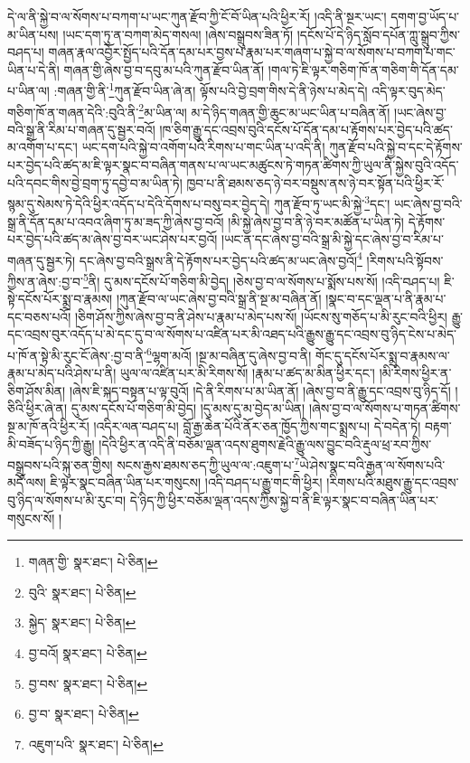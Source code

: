 དེ་ལ་ནི་སྐྱེ་བ་ལ་སོགས་པ་བཀག་པ་ཡང་ཀུན་རྫོབ་ཀྱི་ངོ་བོ་ཡིན་པའི་ཕྱིར་རོ། །འདི་ནི་སྔར་ཡང་། དགག་བྱ་ཡོད་པ་མ་ཡིན་པས། །ཡང་དག་ཏུ་ན་བཀག་མེད་གསལ། །ཞེས་བསྒྲུབས་ཟིན་ཏོ། །དངོས་པོ་དེ་ཉིད་སློབ་དཔོན་ཀླུ་སྒྲུབ་ཀྱིས་བཤད་པ། གཞན་རྣལ་འབྱོར་སྤྱོད་པའི་དོན་དམ་པར་བྱས་པ་རྣམ་པར་གཞག་པ་སྐྱེ་བ་ལ་སོགས་པ་བཀག་པ་གང་ཡིན་པ་དེ་ནི། གཞན་གྱི་ཞེས་བྱ་བ་དབུ་མ་པའི་ཀུན་རྫོབ་ཡིན་ནོ། །གལ་ཏེ་ཇི་ལྟར་གཅིག་ཁོ་ན་གཅིག་གི་དོན་དམ་པ་ཡིན་ལ། :གཞན་གྱི་ནི་\footnote{གཞན་གྱི་  སྣར་ཐང་།  པེ་ཅིན། }ཀུན་རྫོབ་ཡིན་ཞེ་ན། ལྟོས་པའི་བྱེ་བྲག་གིས་དེ་ནི་ཉེས་པ་མེད་དེ། འདི་ལྟར་བུད་མེད་གཅིག་ཁོ་ན་གཞན་དེའི་:བུའི་ནི་\footnote{བུའི་  སྣར་ཐང་།  པེ་ཅིན། }མ་ཡིན་ལ། མ་དེ་ཉིད་གཞན་གྱི་ཆུང་མ་ཡང་ཡིན་པ་བཞིན་ནོ། །ཡང་ཞེས་བྱ་བའི་སྒྲ་ནི་རིམ་པ་གཞན་དུ་སྦྱར་བའོ། །ཁ་ཅིག་རྒྱུ་དང་འབྲས་བུའི་དངོས་པོ་དོན་དམ་པ་རྟོགས་པར་བྱེད་པའི་ཚད་མ་འགོག་པ་དང་། ཡང་དག་པའི་སྐྱེ་བ་འགོག་པའི་རིགས་པ་གང་ཡིན་པ་འདི་ནི། ཀུན་རྫོབ་པའི་སྐྱེ་བ་དང་དེ་རྟོགས་པར་བྱེད་པའི་ཚད་མ་ཇི་ལྟར་སྣང་བ་བཞིན་གནས་པ་ལ་ཡང་མཚུངས་ཏེ་གཏན་ཚིགས་ཀྱི་ཡུལ་ནི་སྐྱེས་བུའི་འདོད་པའི་དབང་གིས་བྱེ་བྲག་ཏུ་དབྱེ་བ་མ་ཡིན་ཏེ། ཁྱབ་པ་ནི་ཐམས་ཅད་ཉེ་བར་བསྡུས་ནས་ཉེ་བར་སྟོན་པའི་ཕྱིར་རོ་སྙམ་དུ་སེམས་ཏེ་དེའི་ཕྱིར་འདོད་པ་དེའི་དོགས་པ་བསུ་བར་བྱེད་དེ། ཀུན་རྫོབ་ཏུ་ཡང་མི་སྐྱེ་\footnote{སྐྱེད་  སྣར་ཐང་།  པེ་ཅིན། }དང་། ཡང་ཞེས་བྱ་བའི་སྒྲ་ནི་དོན་དམ་པ་འབའ་ཞིག་ཏུ་མ་ཟད་ཀྱི་ཞེས་བྱ་བའོ། །མི་སྐྱེ་ཞེས་བྱ་བ་ནི་ཉེ་བར་མཚོན་པ་ཡིན་ཏེ། དེ་རྟོགས་པར་བྱེད་པའི་ཚད་མ་ཞེས་བྱ་བར་ཡང་ཤེས་པར་བྱའོ། །ཡང་ན་དང་ཞེས་བྱ་བའི་སྒྲ་མི་སྐྱེ་དང་ཞེས་བྱ་བ་རིམ་པ་གཞན་དུ་སྦྱར་ཏེ། དང་ཞེས་བྱ་བའི་སྒྲས་ནི་དེ་རྟོགས་པར་བྱེད་པའི་ཚད་མ་ཡང་ཞེས་བྱའོ།\footnote{བྱ་བའོ།  སྣར་ཐང་།  པེ་ཅིན། } །རིགས་པའི་སྟོབས་ཀྱིས་ན་ཞེས་:བྱ་བ་\footnote{བྱ་བས་  སྣར་ཐང་།  པེ་ཅིན། }ནི། དུ་མས་དངོས་པོ་གཅིག་མི་བྱེད། །ཅེས་བྱ་བ་ལ་སོགས་པ་སྨོས་པས་སོ། །འདི་བཤད་པ། ཇི་སྟེ་དངོས་པོར་སྨྲ་བ་རྣམས། །ཀུན་རྫོབ་ལ་ཡང་ཞེས་བྱ་བའི་སྒྲ་ནི་སྔ་མ་བཞིན་ནོ། །སྣང་བ་དང་ལྡན་པ་ནི་རྣམ་པ་དང་བཅས་པའོ། །ཅིག་ཤོས་ཀྱིས་ཞེས་བྱ་བ་ནི་ཤེས་པ་རྣམ་པ་མེད་པས་སོ། །ཡོངས་སུ་གཅོད་པ་མི་རུང་བའི་ཕྱིར། རྒྱུ་དང་འབྲས་བུར་འདོད་པ་མེ་དང་དུ་བ་ལ་སོགས་པ་འཛིན་པར་མི་འཐད་པའི་རྒྱུས་རྒྱུ་དང་འབྲས་བུ་ཉིད་ངེས་པ་མེད་པ་ཁོ་ན་སྟེ་མི་རུང་ངོ་ཞེས་:བྱ་བ་ནི་\footnote{བྱ་བ་  སྣར་ཐང་།  པེ་ཅིན། }ལྷག་མའོ། །སྔ་མ་བཞིན་དུ་ཞེས་བྱ་བ་ནི། གོང་དུ་དངོས་པོར་སྨྲ་བ་རྣམས་ལ་རྣམ་པ་མེད་པའི་ཤེས་པ་ནི། ཡུལ་ལ་འཛིན་པར་མི་རིགས་སོ། །རྣམ་པ་ཚད་མ་མིན་ཕྱིར་དང་། །མི་རིགས་ཕྱིར་ན་ཅིག་ཤོས་མིན། །ཞེས་ཇི་སྐད་བསྟན་པ་ལྟ་བུའོ། །དེ་ནི་རིགས་པ་མ་ཡིན་ནོ། །ཞེས་བྱ་བ་ནི་རྒྱུ་དང་འབྲས་བུ་ཉིད་དོ། །ཅིའི་ཕྱིར་ཞེ་ན། དུ་མས་དངོས་པོ་གཅིག་མི་བྱེད། །དུ་མས་དུ་མ་བྱེད་མ་ཡིན། །ཞེས་བྱ་བ་ལ་སོགས་པ་གཏན་ཚིགས་སྔ་མ་ཁོ་ནའི་ཕྱིར་རོ། །འདིར་ལན་བཤད་པ། བློ་རྒྱ་ཆེན་པོའི་ནོར་ཅན་ཁྱོད་ཀྱིས་གང་སྨྲས་པ། དེ་བདེན་ཏེ། བརྟག་མི་བཟོད་པ་ཉིད་ཀྱི་རྒྱུ། །དེའི་ཕྱིར་ན་འདི་ནི་བཅོམ་ལྡན་འདས་ཐུགས་རྗེའི་རྒྱུ་ལས་བྱུང་བའི་རྡུལ་ཕྲ་རབ་ཀྱིས་བསྒྲུབས་པའི་སྐུ་ཅན་གྱིས། སངས་རྒྱས་ཐམས་ཅད་ཀྱི་ཡུལ་ལ་:འཇུག་པ་\footnote{འཇུག་པའི་  སྣར་ཐང་།  པེ་ཅིན། }ཡེ་ཤེས་སྣང་བའི་རྒྱན་ལ་སོགས་པའི་མདོ་ལས། ཇི་ལྟར་སྣང་བཞིན་ཡིན་པར་གསུངས། །འདི་བཤད་པ་རྒྱུ་གང་གི་ཕྱིར། །རིགས་པའི་མཐུས་རྒྱུ་དང་འབྲས་བུ་ཉིད་ལ་སོགས་པ་མི་རུང་བ། དེ་ཉིད་ཀྱི་ཕྱིར་བཅོམ་ལྡན་འདས་ཀྱིས་སྐྱེ་བ་ནི་ཇི་ལྟར་སྣང་བ་བཞིན་ཡིན་པར་གསུངས་སོ། །
